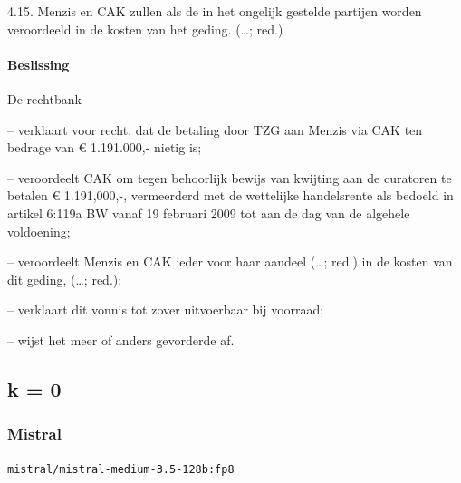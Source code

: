 \documentclass[
  dutch,
  a4paper,
]{article}
\begin{document}
4.15. Menzis en CAK zullen als de in het ongelijk gestelde partijen worden veroordeeld in de kosten van het geding. (\ldots; red.)

\paragraph{Beslissing}\label{beslissing-1}

De rechtbank

-- verklaart voor recht, dat de betaling door TZG aan Menzis via CAK ten bedrage van € 1.191.000,- nietig is;

-- veroordeelt CAK om tegen behoorlijk bewijs van kwijting aan de curatoren te betalen € 1.191,000,-, vermeerderd met de wettelijke handelsrente als bedoeld in artikel 6:119a BW vanaf 19 februari 2009 tot aan de dag van de algehele voldoening;

-- veroordeelt Menzis en CAK ieder voor haar aandeel (\ldots; red.) in de kosten van dit geding, (\ldots; red.);

-- verklaart dit vonnis tot zover uitvoerbaar bij voorraad;

-- wijst het meer of anders gevorderde af.

\newpage


\subsection{k = 0}\label{k-0-9}

\subsubsection{Mistral}\label{mistral-27}

\texttt{mistral/mistral-medium-3.5-128b:fp8}
\end{document}
